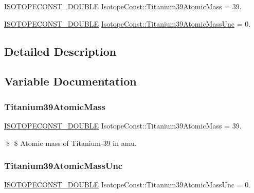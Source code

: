 \begin{DoxyCompactItemize}
\item 
\mbox{\hyperlink{group___isotope_const-_macros_ga8f45a7272ce02c0b4c65c44636ed719a}{I\+S\+O\+T\+O\+P\+E\+C\+O\+N\+S\+T\+\_\+\+D\+O\+U\+B\+LE}} \mbox{\hyperlink{group___isotope_const-_titanium-_ti39_ga1d70081f160ae66854257d996ffa95c9}{Isotope\+Const\+::\+Titanium39\+Atomic\+Mass}} = 39.
\item 
\mbox{\hyperlink{group___isotope_const-_macros_ga8f45a7272ce02c0b4c65c44636ed719a}{I\+S\+O\+T\+O\+P\+E\+C\+O\+N\+S\+T\+\_\+\+D\+O\+U\+B\+LE}} \mbox{\hyperlink{group___isotope_const-_titanium-_ti39_ga8b1ebe5657046edeb9836ed674742600}{Isotope\+Const\+::\+Titanium39\+Atomic\+Mass\+Unc}} = 0.
\end{DoxyCompactItemize}


\subsection{Detailed Description}


\subsection{Variable Documentation}
\mbox{\label{group___isotope_const-_titanium-_ti39_ga1d70081f160ae66854257d996ffa95c9}} 
\subsubsection{\texorpdfstring{Titanium39\+Atomic\+Mass}{Titanium39AtomicMass}}
{\footnotesize\ttfamily \mbox{\hyperlink{group___isotope_const-_macros_ga8f45a7272ce02c0b4c65c44636ed719a}{I\+S\+O\+T\+O\+P\+E\+C\+O\+N\+S\+T\+\_\+\+D\+O\+U\+B\+LE}} Isotope\+Const\+::\+Titanium39\+Atomic\+Mass = 39.}

\$ \$ Atomic mass of Titanium-\/39 in amu. \mbox{\label{group___isotope_const-_titanium-_ti39_ga8b1ebe5657046edeb9836ed674742600}} 
\subsubsection{\texorpdfstring{Titanium39\+Atomic\+Mass\+Unc}{Titanium39AtomicMassUnc}}
{\footnotesize\ttfamily \mbox{\hyperlink{group___isotope_const-_macros_ga8f45a7272ce02c0b4c65c44636ed719a}{I\+S\+O\+T\+O\+P\+E\+C\+O\+N\+S\+T\+\_\+\+D\+O\+U\+B\+LE}} Isotope\+Const\+::\+Titanium39\+Atomic\+Mass\+Unc = 0.}

